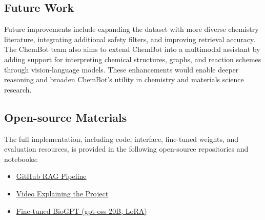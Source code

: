 \subsection*{Future Work}
Future improvements include expanding the dataset with more diverse chemistry literature, integrating additional safety filters, and improving retrieval accuracy. The ChemBot team also aims to extend ChemBot into a multimodal assistant by adding support for interpreting chemical structures, graphs, and reaction schemes through vision-language models. These enhancements would enable deeper reasoning and broaden ChemBot’s utility in chemistry and materials science research.

\subsection*{Open-source Materials}
The full implementation, including code, interface, fine-tuned weights, and evaluation resources, is provided in the following open-source repositories and notebooks:

\begin{itemize}
    \item \href{https://github.com/aishahasim/ChemBot---AI-Assisted-Chemistry-Assistant}{GitHub RAG Pipeline}
    \item \href{https://www.linkedin.com/posts/s-aishah-asim-335b191a7_llmhackathon-materialsscience-chemistry-activity-7372329143130034177-1-2D?utm_source=share&utm_medium=member_desktop&rcm=ACoAADBlw5kBLVvXchGkkN0nCe7h7fo-N2clA1k}{Video Explaining the Project}
    \item \href{https://huggingface.co/umairbinmansoor/finetuned_model/tree/main}{Fine-tuned BioGPT (gpt-oss 20B, LoRA)}
\end{itemize}






